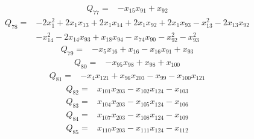 \begin{equation*}\begin{aligned}
Q_{77}={}& -x_{15}x_{91}+x_{92}
\end{aligned}\end{equation*}
\begin{equation*}\begin{aligned}
Q_{78}={}& -2x_{1}^{2}+2x_{1}x_{13}+2x_{1}x_{14}+2x_{1}x_{92}+2x_{1}x_{93}-x_{13}^{2}-2x_{13}x_{92}\\
& -x_{14}^{2}-2x_{14}x_{93}+x_{18}x_{94}-x_{74}x_{90}-x_{92}^{2}-x_{93}^{2}
\end{aligned}\end{equation*}
\begin{equation*}\begin{aligned}
Q_{79}={}& -x_{5}x_{16}+x_{16}-x_{16}x_{91}+x_{93}
\end{aligned}\end{equation*}
\begin{equation*}\begin{aligned}
Q_{80}={}& -x_{95}x_{98}+x_{98}+x_{100}
\end{aligned}\end{equation*}
\begin{equation*}\begin{aligned}
Q_{81}={}& -x_{4}x_{121}+x_{96}x_{203}-x_{99}-x_{100}x_{121}
\end{aligned}\end{equation*}
\begin{equation*}\begin{aligned}
Q_{82}={}& x_{101}x_{203}-x_{102}x_{124}-x_{103}
\end{aligned}\end{equation*}
\begin{equation*}\begin{aligned}
Q_{83}={}& x_{104}x_{203}-x_{105}x_{124}-x_{106}
\end{aligned}\end{equation*}
\begin{equation*}\begin{aligned}
Q_{84}={}& x_{107}x_{203}-x_{108}x_{124}-x_{109}
\end{aligned}\end{equation*}
\begin{equation*}\begin{aligned}
Q_{85}={}& x_{110}x_{203}-x_{111}x_{124}-x_{112}
\end{aligned}\end{equation*}
